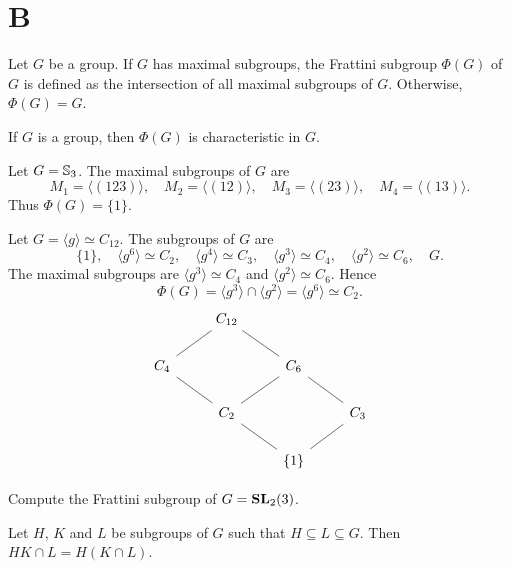 \section*{B}

Let $G$ be a group. If $G$ has maximal subgroups, the Frattini subgroup
$\Phi(G)$ of $G$ is defined as the intersection of all maximal subgroups of $G$. 
Otherwise, $\Phi(G)=G$.

\begin{exercise}
\label{xca:Phi(G)char}
	If $G$ is a group, then $\Phi(G)$ is characteristic in $G$.
\end{exercise}

\begin{example}
	Let $G=\mathbb{S}_3$. The maximal subgroups of $G$ are 
	\[
	M_1=\langle (123)\rangle,
	\quad
	M_2=\langle (12)\rangle,
	\quad
	M_3=\langle (23)\rangle,
	\quad
	M_4=\langle (13)\rangle.
	\]
	Thus 
	$\Phi(G)=\{1\}$. 
\end{example}

\begin{example}
	Let $G=\langle g\rangle\simeq C_{12}$. The subgroups of $G$ are  
	\[
	\{1\},\quad
	\langle g^6\rangle\simeq C_2,\quad
	\langle g^4\rangle\simeq C_3,\quad
	\langle g^3\rangle\simeq C_4,\quad
	\langle g^2\rangle\simeq C_6,\quad
	G.
	\]
	The maximal subgroups are $\langle g^3\rangle\simeq C_4$ and $\langle
	g^2\rangle\simeq C_6$. Hence \[
	\Phi(G)=\langle g^3\rangle\cap \langle
	g^2\rangle=\langle g^6\rangle\simeq C_2.
	\] 
\[\begin{tikzcd}
	& {C_{12}} \\
	{C_4} && {C_6} \\
	& {C_2} && {C_3} \\
	&& {\{1\}}
	\arrow[no head, from=4-3, to=3-2]
	\arrow[no head, from=4-3, to=3-4]
	\arrow[no head, from=3-4, to=2-3]
	\arrow[no head, from=2-3, to=1-2]
	\arrow[no head, from=3-2, to=2-1]
	\arrow[no head, from=2-1, to=1-2]
	\arrow[no head, from=3-2, to=2-3]
\end{tikzcd}\]
\end{example}

\begin{exercise}
	Compute the Frattini subgroup of $G=\mathbf{SL}_2(3)$.  
\end{exercise}

\begin{lemma}[Dedekind]
	\label{lem:Dedekind}
	Let $H$, $K$ and $L$ be subgroups of $G$ such that $H\subseteq L\subseteq G$. Then
	$HK\cap L=H(K\cap L)$.
\end{lemma}

